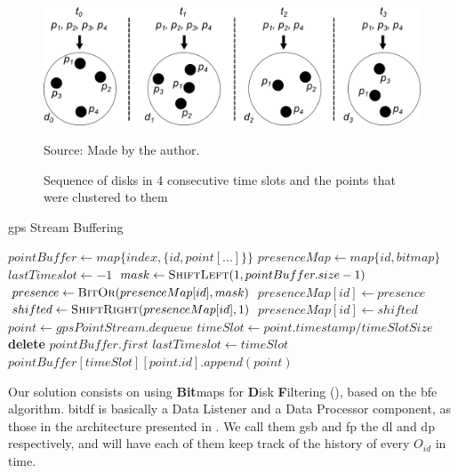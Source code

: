 \begin{figure}[h!]
    \centering
    \caption{Sequence of disks in 4 consecutive time slots and the points that were clustered to them}
    \centerline{\includegraphics[width=\linewidth]{images/disks_2.png}}
    \footnotesize{Source: Made by the author.}
    \label{fig:disks}
\end{figure}

\begin{algorithm}[h!]
\caption{\ac{gps} Stream Buffering}
\label{alg:gpsb}
\begin{algorithmic}[1]
    \State $pointBuffer \gets map\{index, \{id, point[...]\}\}$
    \State $presenceMap \gets map\{id, bitmap\}$
    \State $lastTimeslot \gets -1$
    \State
        \State $mask \gets \Call{ShiftLeft}{1, pointBuffer.size - 1}$
        \State $presence \gets \Call{BitOr}{presenceMap[id], mask}$
        \State $presenceMap[id] \gets presence$
    \EndProcedure
    \State
            \State $shifted \gets \Call{ShiftRight}{presenceMap[id], 1}$
            \State $presenceMap[id] \gets shifted$
        \EndFor
    \EndProcedure
    \State
        \Loop
            \State $point \gets gpsPointStream.dequeue$
            \State $timeSlot \gets point.timestamp / timeSlotSize$
                    \State {}
                    \State \textbf{delete} $pointBuffer.first$
                    \State {}
                \EndIf
                \State $lastTimeslot \gets timeSlot$
            \EndIf
            \State $pointBuffer[timeSlot][point.id].append(point)$
            \State {}
        \EndLoop
    \EndProcedure
\end{algorithmic}
\end{algorithm}

Our solution consists on using \textbf{Bit}maps for \textbf{D}isk \textbf{F}iltering (), based on the
\ac{bfe} algorithm. \ac{bitdf} is basically a Data Listener and a Data Processor component, as those in the architecture
presented in . We call them \ac{gsb} and \ac{fp} the \ac{dl} and \ac{dp} respectively, and will
have each of them keep track of the history of every $O_{id}$ in time.

